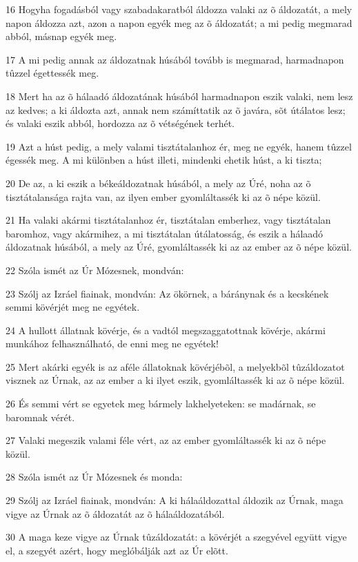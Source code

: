 \par 16 Hogyha fogadásból vagy szabadakaratból áldozza valaki az õ áldozatát, a mely napon áldozza azt, azon a napon egyék meg az õ áldozatát; a mi pedig megmarad abból, másnap egyék meg.
\par 17 A mi pedig annak az áldozatnak húsából tovább is megmarad, harmadnapon tûzzel égettessék meg.
\par 18 Mert ha az õ hálaadó áldozatának húsából harmadnapon eszik valaki, nem lesz az kedves; a ki áldozta azt, annak nem számíttatik az õ javára, sõt útálatos lesz; és valaki eszik abból, hordozza az õ vétségének terhét.
\par 19 Azt a húst pedig, a mely valami tisztátalanhoz ér, meg ne egyék, hanem tûzzel égessék meg. A mi különben a húst illeti, mindenki ehetik húst, a ki tiszta;
\par 20 De az, a ki eszik a békeáldozatnak húsából, a mely az Úré, noha az õ tisztátalansága rajta van, az ilyen ember gyomláltassék ki az õ népe közül.
\par 21 Ha valaki akármi tisztátalanhoz ér, tisztátalan emberhez, vagy tisztátalan baromhoz, vagy akármihez, a mi tisztátalan útálatosság, és eszik a hálaadó áldozatnak húsából, a mely az Úré, gyomláltassék ki az az ember az õ népe közül.
\par 22 Szóla ismét az Úr Mózesnek, mondván:
\par 23 Szólj az Izráel fiainak, mondván: Az ökörnek, a báránynak és a kecskének semmi kövérjét meg ne egyétek.
\par 24 A hullott állatnak kövérje, és a vadtól megszaggatottnak kövérje, akármi munkához felhasználható, de enni meg ne egyétek!
\par 25 Mert akárki egyék is az aféle állatoknak kövérjébõl, a melyekbõl tûzáldozatot visznek az Úrnak, az az ember a ki ilyet eszik, gyomláltassék ki az õ népe közül.
\par 26 És semmi vért se egyetek meg bármely lakhelyeteken: se madárnak, se baromnak vérét.
\par 27 Valaki megeszik valami féle vért, az az ember gyomláltassék ki az õ népe közül.
\par 28 Szóla ismét az Úr Mózesnek és monda:
\par 29 Szólj az Izráel fiainak, mondván: A ki hálaáldozattal áldozik az Úrnak, maga vigye az Úrnak az õ áldozatát az õ hálaáldozatából.
\par 30 A maga keze vigye az Úrnak tûzáldozatát: a kövérjét a szegyével együtt vigye el, a szegyét azért, hogy meglóbálják azt az Úr elõtt.
